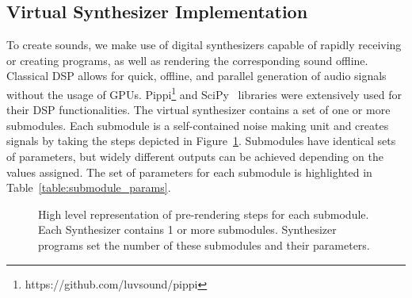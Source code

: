 \documentclass[\main/thesis.tex]{subfiles}
\begin{document}
\subsection{Virtual Synthesizer Implementation}
 To create sounds, we make use of digital synthesizers capable of rapidly receiving or creating programs, as well as rendering the corresponding sound offline. Classical DSP allows for quick, offline, and parallel generation of audio signals without the usage of GPUs. Pippi\footnote{https://github.com/luvsound/pippi} and SciPy~\cite{jones2001scipy} libraries were extensively used for their DSP functionalities. The virtual synthesizer contains a set of one or more submodules. Each submodule is a self-contained noise making unit and creates signals by taking the steps depicted in Figure~\ref{fig:submodule}. Submodules have identical sets of parameters, but widely different outputs can be achieved depending on the values assigned. The set of parameters for each submodule is highlighted in Table~\ref{table:submodule_params}.

 \begin{figure}[htbp]
    \begin{center}
    \end{center}
    \caption{High level representation of pre-rendering steps for each submodule. Each Synthesizer contains 1 or more submodules. Synthesizer programs set the number of these submodules and their parameters.
    }
\label{fig:submodule}
\end{figure}
\end{document}
